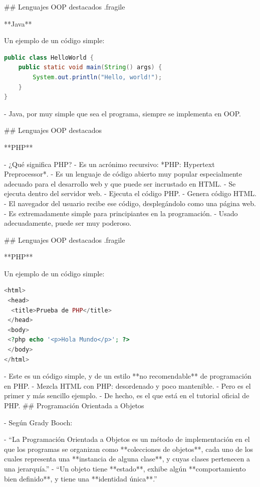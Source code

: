 ## Lenguajes OOP destacados {.fragile}

**Java**\vfill

Un ejemplo de un código simple:
\begin{lstlisting}[language=Java]
public class HelloWorld {
    public static void main(String() args) {
        System.out.println("Hello, world!");
    }
}
\end{lstlisting}

- Java, por muy simple que sea el programa, siempre se implementa en OOP.

## Lenguajes OOP destacados

**PHP**

- ¿Qué significa PHP?
    - Es un acrónimo recursivo: *PHP: Hypertext Preprocessor*.
- Es un lenguaje de código abierto muy popular especialmente adecuado para el desarrollo web y que puede ser incrustado en HTML. 
- Se ejecuta dentro del servidor web.
    - Ejecuta el código PHP.
    - Genera código HTML.
    - El navegador del usuario recibe ese código, desplegándolo como una página web.
- Es extremadamente simple para principiantes en la programación.
    - Usado adecuadamente, puede ser muy poderoso.

## Lenguajes OOP destacados {.fragile}

**PHP**\vfill

Un ejemplo de un código simple:
\begin{lstlisting}[language=PHP]
<html>
 <head>
  <title>Prueba de PHP</title>
 </head>
 <body>
 <?php echo '<p>Hola Mundo</p>'; ?>
 </body>
</html>
\end{lstlisting}

- Este es un código simple, y de un estilo **no recomendable** de programación en PHP.
    - Mezcla HTML con PHP: desordenado y poco mantenible.
    - Pero es el primer y más sencillo ejemplo.
    - De hecho, es el que está en el tutorial oficial de PHP.
## Programación Orientada a Objetos

- Según Grady Booch:\vspace{7mm}

    - ``La Programación Orientada a Objetos es un método de implementación en el que los programas se organizan como **colecciones de objetos**, cada uno de los cuales representa una **instancia de alguna clase**, y cuyas clases pertenecen a una jerarquía.''\vspace{10mm}
    - ``Un objeto tiene **estado**, exhibe algún **comportamiento bien definido**, y tiene una **identidad única**.''

